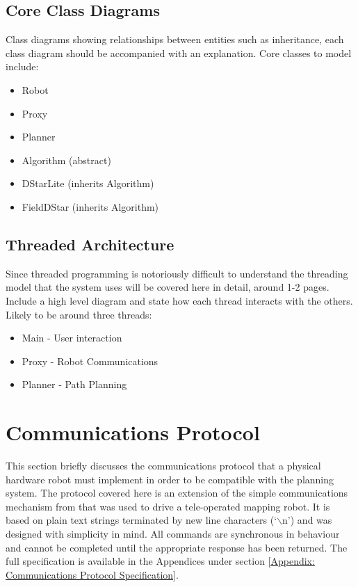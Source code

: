 \subsection{Core Class Diagrams}

\noindent
Class diagrams showing relationships between entities such as inheritance, each class diagram should be accompanied with an explanation. Core classes to model include:

\begin{itemize}
\item Robot
\item Proxy
\item Planner
\item Algorithm (abstract)
\item DStarLite (inherits Algorithm)
\item FieldDStar (inherits Algorithm)
\end{itemize} 

\newpage

\subsection{Threaded Architecture}

\noindent
Since threaded programming is notoriously difficult to understand the threading model that the system uses will be covered here in detail, around 1-2 pages. Include a high level diagram and state how each thread interacts with the others. Likely to be around three threads:

\begin{itemize}
\item Main - User interaction
\item Proxy - Robot Communications
\item Planner - Path Planning
\end{itemize} 

\newpage


\section{Communications Protocol}\label{sec:protocol}
\noindent
This section briefly discusses the communications protocol that a physical hardware robot must implement in order to be compatible with the planning system. The protocol covered here is an extension of the simple communications mechanism from \cite{JMD14} that was used to drive a tele-operated mapping robot. It is based on plain text strings terminated by new line characters (`$\backslash$n') and was designed with simplicity in mind. All commands are synchronous in behaviour and cannot be completed until the appropriate response has been returned. The full specification is available in the Appendices under section \ref{Appendix: Communications Protocol Specification}.

